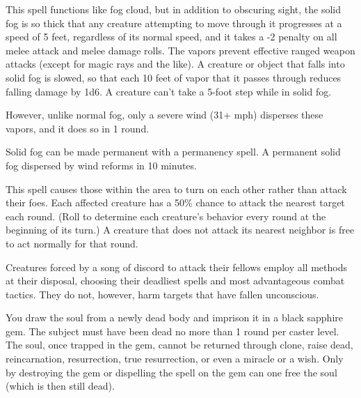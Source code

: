 \begin{multicols}{2}
\begin{small}
\noindent This spell functions like fog cloud, but in addition to obscuring sight, the solid fog is so thick that any creature attempting to move through it progresses at a speed of 5 feet, regardless of its normal speed, and it takes a -2 penalty on all melee attack and melee damage rolls. The vapors prevent effective ranged weapon attacks (except for magic rays and the like). A creature or object that falls into solid fog is slowed, so that each 10 feet of vapor that it passes through reduces falling damage by 1d6. A creature can't take a 5-foot step while in solid fog.

\smallskip\noindent However, unlike normal fog, only a severe wind (31+ mph) disperses these vapors, and it does so in 1 round.

\smallskip\noindent Solid fog can be made permanent with a permanency spell. A permanent solid fog dispersed by wind reforms in 10 minutes.


\noindent This spell causes those within the area to turn on each other rather than attack their foes. Each affected creature has a 50\% chance to attack the nearest target each round. (Roll to determine each creature's behavior every round at the beginning of its turn.) A creature that does not attack its nearest neighbor is free to act normally for that round.

\smallskip\noindent Creatures forced by a song of discord to attack their fellows employ all methods at their disposal, choosing their deadliest spells and most advantageous combat tactics. They do not, however, harm targets that have fallen unconscious.

\noindent You draw the soul from a newly dead body and imprison it in a black sapphire gem. The subject must have been dead no more than 1 round per caster level. The soul, once trapped in the gem, cannot be returned through clone, raise dead, reincarnation, resurrection, true resurrection, or even a miracle or a wish. Only by destroying the gem or dispelling the spell on the gem can one free the soul (which is then still dead).


\end{small}
\end{multicols}
